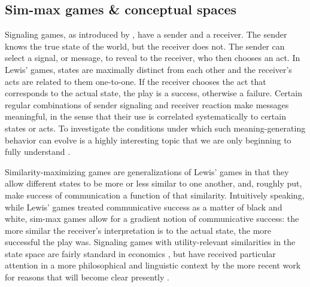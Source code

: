 \subsection{Sim-max games \& conceptual spaces}

Signaling games, as introduced by \citet{Lewis_1969:Convention}, have
a sender and a receiver. The sender knows the true state of the world,
but the receiver does not. The sender can select a signal, or message,
to reveal to the receiver, who then chooses an act. In Lewis' games,
states are maximally distinct from each other and the receiver's acts
are related to them one-to-one. If the receiver chooses the act that
corresponds to the actual state, the play is a success, otherwise a
failure. Certain regular combinations of sender signaling and receiver
reaction make messages meaningful, in the sense that their use is
correlated systematically to certain states or acts. To investigate
the conditions under which such meaning-generating behavior can evolve
is a highly interesting topic that we are only beginning to fully
understand
\citep[e.g.][]{Warneryd1993:Cheap-Talk-Coor,BlumeKim1993:Evolutionary-St,Zollman2005:Talking-to-Neig,Huttegger2007:Evolution-and-t,Pawlowitsch2008:Why-Evolution-d,Barrett2009:The-Evolution-o,Wagner2009:Communication-a,HutteggerSkyrms2010:Evolutionary-Dy,Skyrms2010:Signals,HutteggerZollman2011:Signaling-Games}.

Similarity-maximizing games are generalizations of Lewis' games in
that they allow different states to be more or less similar to one
another, and, roughly put, make success of communication a function of
that similarity. Intuitively speaking, while Lewis' games treated
communicative success as a matter of black and white, sim-max games
allow for a gradient notion of communicative success: the more similar
the receiver's interpretation is to the actual state, the more
successful the play was. Signaling games with utility-relevant
similarities in the state space are fairly standard in economics
\citep[e.g.][]{Spence1973:Job-market-sign,CrawfordSobel1982:Strategic-Infor},
but have received particular attention in a more philosophical and
linguistic context by the more recent work for reasons that will
become clear presently
\citep{Jager2007:The-Evolution-o,JagerRooijvan-Rooij2007:Language-Struct,JagerMetzger2011:Voronoi-Languag}.

